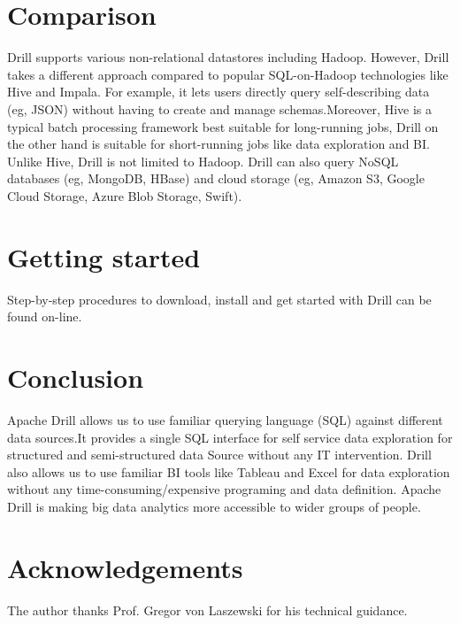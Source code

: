 \documentclass[9pt,twocolumn,twoside]{../../styles/osajnl}
\begin{document}
\section{Comparison}
	Drill supports various non-relational datastores including Hadoop. However,
	Drill takes a different approach compared to popular SQL-on-Hadoop technologies
	like Hive and Impala. For example, it lets users directly query self-describing
	data (eg, JSON) without having to create and manage schemas.Moreover, Hive is a
	typical batch processing framework best suitable for long-running jobs, Drill on
	the other hand is suitable for short-running jobs like data exploration and BI.
	Unlike Hive, Drill is not limited to Hadoop. Drill can also query NoSQL
	databases (eg, MongoDB, HBase) and cloud storage (eg, Amazon S3, Google Cloud
	Storage, Azure Blob Storage, Swift).

\section{Getting started}
	Step-by-step procedures to download, install and get started with Drill can be found on-line.\cite{Tutorial}

\section{Conclusion}
	Apache Drill allows us to use familiar querying language (SQL) against different
	data sources.It provides a single SQL interface for self service data
	exploration for structured and semi-structured data Source without any IT
	intervention. Drill also allows us to use familiar BI tools like Tableau and
	Excel for data exploration without any time-consuming/expensive programing and
	data definition. Apache Drill is making big data analytics more accessible to
	wider groups of people. 

\section*{Acknowledgements}

	The author thanks Prof. Gregor von Laszewski for his technical guidance.



\end{document}
